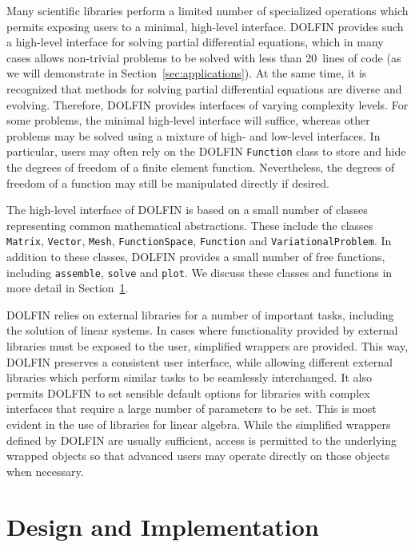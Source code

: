 \documentclass[acmtoms]{acmtrans2m}
\newcommand{\emp}[1]{\texttt{#1}}
\newcommand{\dolfin}{DOLFIN}
\begin{document}
Many scientific libraries perform a limited number of specialized
operations which permits exposing users to a minimal, high-level
interface. \dolfin{} provides such a high-level interface for solving
partial differential equations, which in many cases allows non-trivial
problems to be solved with less than 20~lines of code (as we will
demonstrate in Section~\ref{sec:applications}). At the same time, it
is recognized that methods for solving partial differential equations
are diverse and evolving. Therefore, \dolfin{} provides interfaces of
varying complexity levels. For some problems, the minimal high-level
interface will suffice, whereas other problems may be solved using a
mixture of high- and low-level interfaces. In particular, users may often
rely on the \dolfin{} \emp{Function} class to store and hide the
degrees of freedom of a finite element function. Nevertheless, the
degrees of freedom of a function may still be manipulated directly if
desired.

The high-level interface of \dolfin{} is based on a small number of
classes representing common mathematical abstractions. These include
the classes \emp{Matrix}, \emp{Vector}, \emp{Mesh},
\emp{FunctionSpace}, \emp{Function} and \emp{VariationalProblem}. In
addition to these classes, \dolfin{} provides a small number of free
functions, including \emp{assemble}, \emp{solve} and \emp{plot}. We
discuss these classes and functions in more detail in
Section~\ref{sec:implementation}.

\dolfin{} relies on external libraries for a number of important
tasks, including the solution of linear systems. In cases where
functionality provided by external libraries must be exposed to the
user, simplified wrappers are provided. This way, \dolfin{}
preserves a consistent user interface, while allowing different
external libraries which perform similar tasks to be seamlessly
interchanged. It also permits \dolfin{} to set sensible default
options for libraries with complex interfaces that require a large
number of parameters to be set. This is most evident in the use of
libraries for linear algebra.
While the simplified wrappers
defined by \dolfin{} are usually sufficient, access is permitted to the
underlying wrapped objects so that advanced users may operate directly
on those objects when necessary.

\section{Design and Implementation}
\label{sec:implementation}
\end{document}

